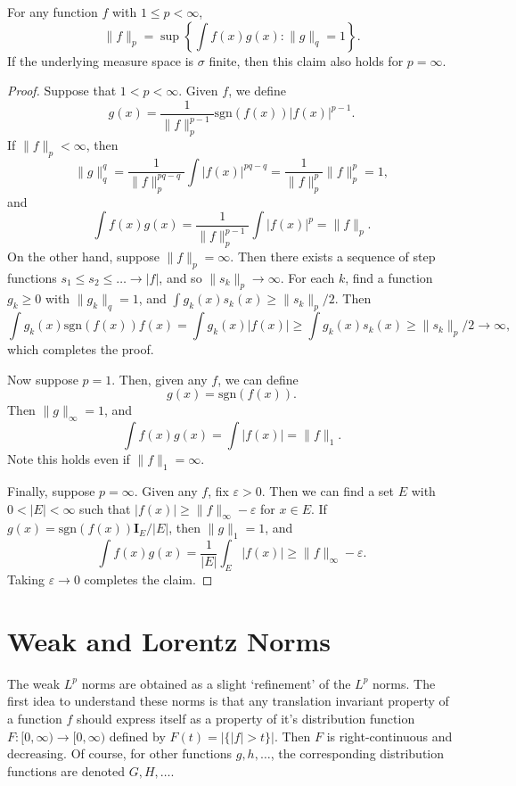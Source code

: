 \begin{theorem}
    For any function $f$ with $1 \leq p < \infty$,
    \[ \| f \|_p = \sup \left\{ \int f(x)g(x) : \| g \|_q = 1 \right\}. \]
    If the underlying measure space is $\sigma$ finite, then this claim also holds for $p = \infty$.
\end{theorem}
\begin{proof}
    Suppose that $1 < p < \infty$. Given $f$, we define
    \[ g(x) = \frac{1}{\| f \|_p^{p-1}} \text{sgn}(f(x)) |f(x)|^{p-1}. \]
    If $\| f \|_p < \infty$, then
    \[ \| g \|_q^q = \frac{1}{\| f \|_p^{pq - q}} \int |f(x)|^{pq-q} = \frac{1}{\| f \|_p^p} \| f \|_p^p = 1, \]
    and
    \[ \int f(x) g(x) = \frac{1}{\| f \|_p^{p-1}} \int |f(x)|^p = \| f \|_p. \]
    On the other hand, suppose $\| f \|_p = \infty$. Then there exists a sequence of step functions $s_1 \leq s_2 \leq \dots \to |f|$, and so $\| s_k \|_p \to \infty$. For each $k$, find a function $g_k \geq 0$ with $\| g_k \|_q = 1$, and $\int g_k(x) s_k(x) \geq \| s_k \|_p / 2$. Then
    \[ \int g_k(x) \text{sgn}(f(x)) f(x) = \int g_k(x) |f(x)| \geq \int g_k(x) s_k(x) \geq \| s_k \|_p / 2 \to \infty, \]
    which completes the proof. 

    Now suppose $p = 1$. Then, given any $f$, we can define
    \[ g(x) = \text{sgn}(f(x)). \]
    Then $\| g \|_\infty = 1$, and
    \[ \int f(x) g(x) = \int |f(x)| = \| f \|_1. \]
    Note this holds even if $\| f \|_1 = \infty$.

    Finally, suppose $p = \infty$. Given any $f$, fix $\varepsilon > 0$. Then we can find a set $E$ with $0 < |E| < \infty$ such that $|f(x)| \geq \| f \|_\infty - \varepsilon$ for $x \in E$. If $g(x) = \text{sgn}(f(x)) \mathbf{I}_E / |E|$, then $\| g \|_1 = 1$, and
    \[ \int f(x) g(x) = \frac{1}{|E|} \int_E |f(x)| \geq \| f \|_\infty - \varepsilon. \]
    Taking $\varepsilon \to 0$ completes the claim.
\end{proof}

\section{Weak and Lorentz Norms}

The weak $L^p$ norms are obtained as a slight `refinement' of the $L^p$ norms. The first idea to understand these norms is that any translation invariant property of a function $f$ should express itself as a property of it's distribution function $F: [0,\infty) \to [0,\infty)$ defined by $F(t) = |\{ |f| > t \}|$. Then $F$ is right-continuous and decreasing. Of course, for other functions $g, h, \dots$, the corresponding distribution functions are denoted $G,H, \dots$.

